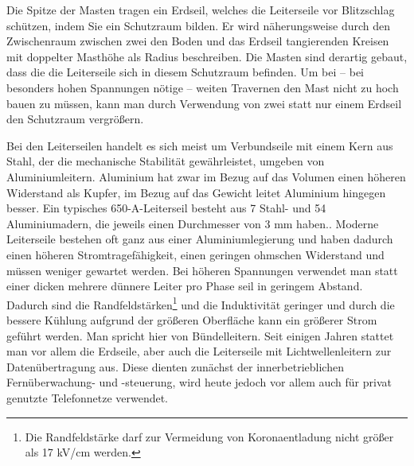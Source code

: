 \documentclass[10pt,a4paper]{article}
\begin{document}
Die Spitze der Masten tragen ein Erdseil, welches die Leiterseile vor Blitzschlag schützen, indem Sie ein Schutzraum bilden. Er wird näherungsweise durch den Zwischenraum zwischen zwei den Boden und das Erdseil tangierenden Kreisen mit doppelter Masthöhe als Radius beschreiben. Die Masten sind derartig gebaut, dass die die Leiterseile sich in diesem Schutzraum befinden. Um bei – bei besonders hohen Spannungen nötige – weiten Travernen den Mast nicht zu hoch bauen zu müssen, kann man durch Verwendung von zwei statt nur einem Erdseil den Schutzraum vergrößern.

Bei den Leiterseilen handelt es sich meist um Verbundseile mit einem Kern aus Stahl, der die mechanische Stabilität gewährleistet, umgeben von Aluminiumleitern. Aluminium hat zwar im Bezug auf das Volumen einen höheren Widerstand als Kupfer, im Bezug auf das Gewicht leitet Aluminium hingegen besser. Ein typisches 650-A-Leiterseil besteht aus 7 Stahl- und 54 Aluminiumadern, die jeweils einen Durchmesser von 3 mm haben.\cite{Harrison}.
Moderne Leiterseile bestehen oft ganz aus einer Aluminiumlegierung und haben dadurch einen höheren Stromtragefähigkeit, einen geringen ohmschen Widerstand und müssen weniger gewartet werden\cite{Harrison}.
Bei höheren Spannungen verwendet man statt einer dicken mehrere dünnere Leiter pro Phase seil in geringem Abstand. Dadurch sind die Randfeldstärken\footnote{Die Randfeldstärke darf zur Vermeidung von Koronaentladung nicht größer als 17 kV/cm werden.\cite{Flosdorff}} und die Induktivität geringer und durch die bessere Kühlung aufgrund der größeren Oberfläche kann ein größerer Strom geführt werden. Man spricht hier von Bündelleitern.
Seit einigen Jahren stattet man vor allem die Erdseile, aber auch die Leiterseile mit Lichtwellenleitern zur Datenübertragung aus. Diese dienten zunächst der innerbetrieblichen Fernüberwachung- und -steuerung, wird heute jedoch vor allem auch für privat genutzte Telefonnetze verwendet.\cite{Flosdorff}
\end{document}
